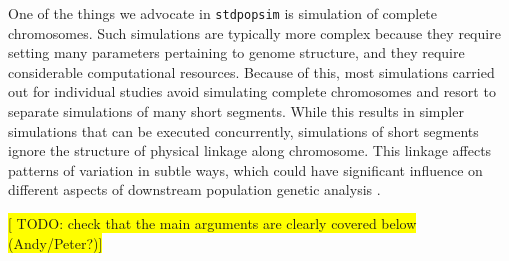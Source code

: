 \documentclass[hidelinks]{article}
\begin{document}
One of the things we advocate in \texttt{stdpopsim} is simulation of complete
chromosomes. Such simulations are typically more complex because they require
setting many parameters pertaining to genome structure, and they require
considerable computational resources. Because of this, most simulations carried
out for individual studies avoid simulating complete chromosomes and resort to
separate simulations of many short segments. While this results in simpler
simulations that can be executed concurrently, %
simulations of short segments ignore the structure of physical linkage along
chromosome. This linkage affects patterns of variation in subtle ways, which could
have significant influence on different aspects of downstream population genetic
analysis \citep{Nelson2020}. 


\noindent\colorbox{yellow}{[ TODO: check that the main arguments are clearly covered below (Andy/Peter?)]}
\end{document}
